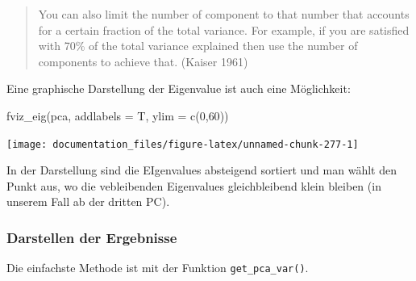 \documentclass[
]{article}
\newenvironment{Shaded}{\begin{snugshade}}{\end{snugshade}}
\newcommand{\AttributeTok}[1]{\textcolor[rgb]{0.77,0.63,0.00}{#1}}
\newcommand{\DecValTok}[1]{\textcolor[rgb]{0.00,0.00,0.81}{#1}}
\newcommand{\DocumentationTok}[1]{\textcolor[rgb]{0.56,0.35,0.01}{\textbf{\textit{#1}}}}
\newcommand{\FunctionTok}[1]{\textcolor[rgb]{0.00,0.00,0.00}{#1}}
\newcommand{\NormalTok}[1]{#1}
\newcommand{\OtherTok}[1]{\textcolor[rgb]{0.56,0.35,0.01}{#1}}
\begin{document}
\begin{quote}
You can also limit the number of component to that number that accounts for a certain fraction of the total variance. For example, if you are satisfied with 70\% of the total variance explained then use the number of components to achieve that. (Kaiser 1961)
\end{quote}

Eine graphische Darstellung der Eigenvalue ist auch eine Möglichkeit:

\begin{Shaded}
\begin{Highlighting}[]
\FunctionTok{fviz\_eig}\NormalTok{(pca, }\AttributeTok{addlabels =}\NormalTok{ T, }\AttributeTok{ylim =} \FunctionTok{c}\NormalTok{(}\DecValTok{0}\NormalTok{,}\DecValTok{60}\NormalTok{))}
\end{Highlighting}
\end{Shaded}

\begin{center}\texttt{[image: documentation\_files/figure-latex/unnamed-chunk-277-1]} \end{center}

In der Darstellung sind die EIgenvalues absteigend sortiert und man wählt den Punkt aus, wo die vebleibenden Eigenvalues gleichbleibend klein bleiben (in unserem Fall ab der dritten PC).

\hypertarget{darstellen-der-ergebnisse}{%
\subsubsection{Darstellen der Ergebnisse}\label{darstellen-der-ergebnisse}}

Die einfachste Methode ist mit der Funktion \texttt{get\_pca\_var()}.

\begin{Shaded}
\end{Shaded}
\end{document}
